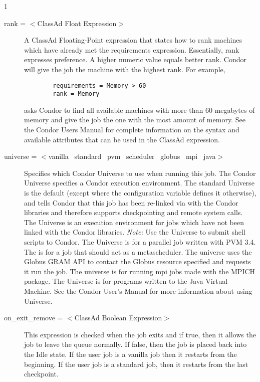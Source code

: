 \begin{ManPage}{\label{man-condor-submit}}{1}
\begin{description}

\item[rank = $<$ClassAd Float Expression$>$]
A ClassAd Floating-Point 
expression that states how to rank machines which have already met the requirements
expression. Essentially, rank expresses preference.  A higher numeric value 
equals better rank. Condor will give the job the machine with the 
highest rank.  For example,
\begin{verbatim}
        requirements = Memory > 60
        rank = Memory
\end{verbatim}
asks Condor to find all available machines with more than 60 megabytes of memory
and give the job the one with the most amount of memory.  See the Condor Users
Manual for complete information on the syntax and available attributes
that can be used in the ClassAd expression.


\item[universe = $<$vanilla \Bar\ standard \Bar\ pvm \Bar\ scheduler
\Bar\ globus \Bar\ mpi \Bar\ java$>$] 
Specifies which Condor Universe to use when running this job.  The Condor 
Universe specifies a Condor execution environment.  The standard 
Universe is the default (except where the configuration variable
 defines it otherwise),
and tells Condor that this job has been re-linked 
via  with the Condor libraries and therefore supports
checkpointing and remote system calls.  The  Universe is an
execution environment for jobs which have not been linked with the
Condor libraries.  \emph{Note:} Use the  Universe to
submit shell scripts to Condor.  The  Universe is for a
parallel job written with PVM 3.4. The  is for a job that
should act as a metascheduler.
The  universe uses the Globus
GRAM API to contact the Globus resource specified and requests it run the job.
The  universe is
for running mpi jobs made with the MPICH package.
The  Universe is for programs written to the Java Virtual Machine.
See the Condor User's Manual for more information about using Universe.


\item[on\_exit\_remove = $<$ClassAd Boolean Expression$>$] This expression
is checked when the job exits and if true, then it allows the job to leave the
queue normally. If false, then the job is placed back into the Idle state.
If the user job is a vanilla job then it restarts from the beginning. If the
user job is a standard job, then it restarts from the last checkpoint.


\end{description}
\end{ManPage}
